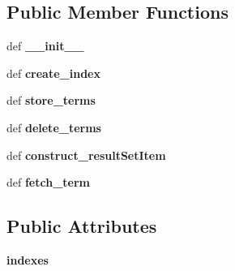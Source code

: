 \subsection*{Public Member Functions}
\begin{DoxyCompactItemize}
\item 
\hypertarget{classcheshire3_1_1test_1_1test_index_1_1_fake_index_store_a599dd15edbf9e1584013b92c989c781c}{def {\bfseries \-\_\-\-\_\-init\-\_\-\-\_\-}}\label{classcheshire3_1_1test_1_1test_index_1_1_fake_index_store_a599dd15edbf9e1584013b92c989c781c}

\item 
\hypertarget{classcheshire3_1_1test_1_1test_index_1_1_fake_index_store_a6c2e924172f04167f8beb7c47ca7f052}{def {\bfseries create\-\_\-index}}\label{classcheshire3_1_1test_1_1test_index_1_1_fake_index_store_a6c2e924172f04167f8beb7c47ca7f052}

\item 
\hypertarget{classcheshire3_1_1test_1_1test_index_1_1_fake_index_store_a36ce6a6bc56ad07534eaf51b135ae476}{def {\bfseries store\-\_\-terms}}\label{classcheshire3_1_1test_1_1test_index_1_1_fake_index_store_a36ce6a6bc56ad07534eaf51b135ae476}

\item 
\hypertarget{classcheshire3_1_1test_1_1test_index_1_1_fake_index_store_acb5d99e1ce62c6adbf1128a5139b9c6b}{def {\bfseries delete\-\_\-terms}}\label{classcheshire3_1_1test_1_1test_index_1_1_fake_index_store_acb5d99e1ce62c6adbf1128a5139b9c6b}

\item 
\hypertarget{classcheshire3_1_1test_1_1test_index_1_1_fake_index_store_a654af5ee8e7d1f507a54dd568275044b}{def {\bfseries construct\-\_\-result\-Set\-Item}}\label{classcheshire3_1_1test_1_1test_index_1_1_fake_index_store_a654af5ee8e7d1f507a54dd568275044b}

\item 
\hypertarget{classcheshire3_1_1test_1_1test_index_1_1_fake_index_store_a6a6898eeded594c22d98b19b66e99bb0}{def {\bfseries fetch\-\_\-term}}\label{classcheshire3_1_1test_1_1test_index_1_1_fake_index_store_a6a6898eeded594c22d98b19b66e99bb0}

\end{DoxyCompactItemize}
\subsection*{Public Attributes}
\begin{DoxyCompactItemize}
\item 
\hypertarget{classcheshire3_1_1test_1_1test_index_1_1_fake_index_store_ad7beb3898a16b5624083d941e7d548f9}{{\bfseries indexes}}\label{classcheshire3_1_1test_1_1test_index_1_1_fake_index_store_ad7beb3898a16b5624083d941e7d548f9}

\end{DoxyCompactItemize}
